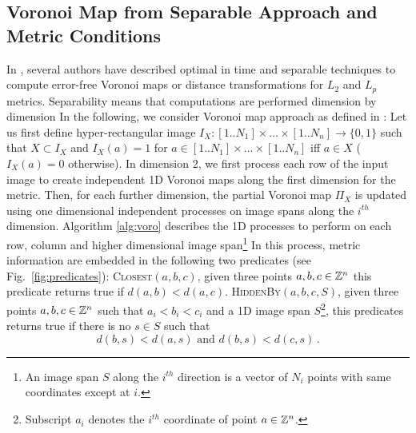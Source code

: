 \documentclass{llncs}
\begin{document}
\subsection{Voronoi Map from Separable Approach and Metric Conditions}
\label{sec:voronoi-map-from}
In \cite{Hirata1996,Breu1995,Meijster2000,Maurer2003},
several authors have described optimal in time and separable
techniques to compute error-free Voronoi maps or distance
transformations for $L_2$ and $L_p$ metrics. Separability means that
computations are performed dimension by dimension
In the following, we
consider Voronoi map approach as defined in \cite{Breu1995}: Let us
first define hyper-rectangular image $I_X:
[1..N_1]\times\ldots\times[1..N_n] \rightarrow \{0,1\}$ such that $X\subset
I_X$ and $I_X(a)= 1$ for $a\in [1..N_1]\times\ldots\times[1..N_n]$ iff $a\in
X$ ($I_X(a)=0$ otherwise). In dimension 2, we first process each row
of the input image to create independent 1D Voronoi maps along the
first dimension for the metric. Then, for each further dimension, the
partial Voronoi map $\Pi_X$ is updated using one dimensional
independent processes on image spans along the $i^{th}$ dimension.
Algorithm \ref{alg:voro} describes the 1D processes to perform on each
row, column and higher dimensional image span\footnote{An image span
  $S$ along the $i^{th}$ direction is a vector of $N_i$ points with
  same coordinates except at $i$.} In this process, metric information
are embedded in the following two predicates (see
Fig.~\ref{fig:predicates}): \textsc{Closest}$(a, b, c)$, given three
points $a,b,c\in{\mathbb{Z}}^n$ this predicate returns true if $d(a,b) <
d(a,c)$. \textsc{HiddenBy}$(a, b, c, S)$, given three points
$a,b,c\in{\mathbb{Z}}^n$ such that $a_i<b_i<c_i$ and a 1D image span
$S$\footnote{Subscript $a_i$ denotes the $i^{th}$ coordinate of point
  $a\in{\mathbb{Z}}^n$.}, this
predicates returns true if there is no $s\in S$ such that
    \begin{equation}
      d(b,s) < d(a,s)\text{ and }  d(b,s) < d(c,s)\,.
    \end{equation}
\end{document}
